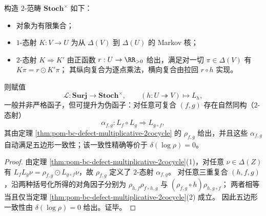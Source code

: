\begin{theorem}\label{thm:pom-bc-uniform-lift-pseudofunctor}
构造 \(2\)-范畴 \(\mathbf{Stoch}^{\times}\) 如下：
\begin{itemize}
  \item 对象为有限集合；
  \item \(1\)-态射 \(K:V\to U\) 为从 \(\Delta(V)\) 到 \(\Delta(U)\) 的 Markov 核；
  \item \(2\)-态射 \(K\Rightarrow K'\) 由正函数 \(r:U\to\RR_{>0}\) 给出，满足对一切 \(\pi\in\Delta(V)\) 有 \(K\pi=r\odot K'\pi\)；
  其纵向复合为逐点乘法，横向复合由拉回 \(r\circ h\) 实现。
\end{itemize}
则赋值
\[
\mathcal L:\mathbf{Surj}\longrightarrow \mathbf{Stoch}^{\times},\qquad
(h:U\twoheadrightarrow V)\longmapsto L_h,
\]
一般并非严格函子，但可提升为伪函子：对任意可复合 \((f,g)\) 存在自然同构（\(2\)-态射）
\[
\alpha_{f,g}:L_f\circ L_g\Longrightarrow L_{g\circ f},
\]
其由定理 \ref{thm:pom-bc-defect-multiplicative-2cocycle} 的 \(\rho_{f,g}\) 给出，并且这些 \(\alpha_{f,g}\) 自动满足五边形一致性；该一致性精确等价于 \(\delta(\log\rho)=0\)。
\end{theorem}
\begin{proof}
由定理 \ref{thm:pom-bc-defect-multiplicative-2cocycle}(1)，对任意 \(\nu\in\Delta(Z)\) 有
\(
L_fL_g\nu=\rho_{f,g}\odot L_{g\circ f}\nu
\)，故 \(\rho_{f,g}\) 定义了 \(2\)-态射 \(\alpha_{f,g}\)。
对任意三重复合 \((h,f,g)\)，沿两种括号化所得的对角因子分别为
\(\rho_{h,f}\rho_{f\circ h,g}\) 与 \((\rho_{f,g}\circ h)\rho_{h,g\circ f}\)；
两者相等当且仅当定理 \ref{thm:pom-bc-defect-multiplicative-2cocycle}(2) 成立。
因此五边形一致性由 \(\delta(\log\rho)=0\) 给出。证毕。
\end{proof}

